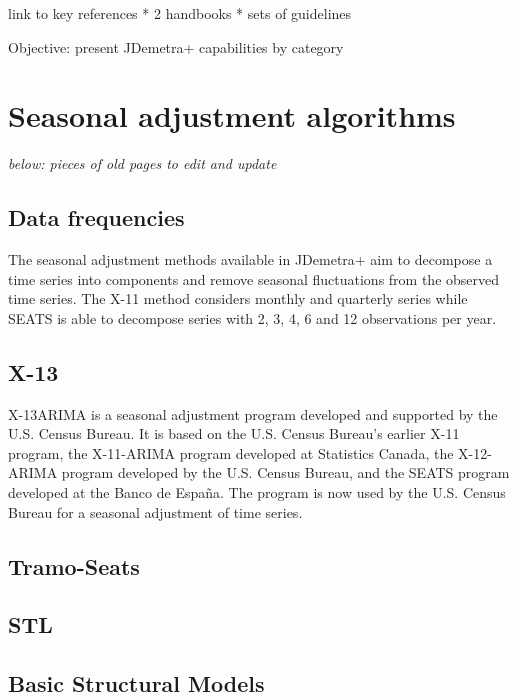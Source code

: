 \documentclass[
  letterpaper,
  DIV=11,
  numbers=noendperiod]{scrreprt}
\begin{document}
link to key references * 2 handbooks * sets of guidelines

Objective: present JDemetra+ capabilities by category

\hypertarget{seasonal-adjustment-algorithms}{%
\section{Seasonal adjustment
algorithms}\label{seasonal-adjustment-algorithms}}

\emph{below: pieces of old pages to edit and update}

\hypertarget{data-frequencies}{%
\subsection{Data frequencies}\label{data-frequencies}}

The seasonal adjustment methods available in JDemetra+ aim to decompose
a time series into components and remove seasonal fluctuations from the
observed time series. The X-11 method considers monthly and quarterly
series while SEATS is able to decompose series with 2, 3, 4, 6 and 12
observations per year.

\hypertarget{x-13}{%
\subsection{X-13}\label{x-13}}

X-13ARIMA is a seasonal adjustment program developed and supported by
the U.S. Census Bureau. It is based on the U.S. Census Bureau's earlier
X-11 program, the X-11-ARIMA program developed at Statistics Canada, the
X-12-ARIMA program developed by the U.S. Census Bureau, and the SEATS
program developed at the Banco de España. The program is now used by the
U.S. Census Bureau for a seasonal adjustment of time series.

\hypertarget{tramo-seats}{%
\subsection{Tramo-Seats}\label{tramo-seats}}

\hypertarget{stl}{%
\subsection{STL}\label{stl}}

\hypertarget{basic-structural-models}{%
\subsection{Basic Structural Models}\label{basic-structural-models}}
\end{document}
